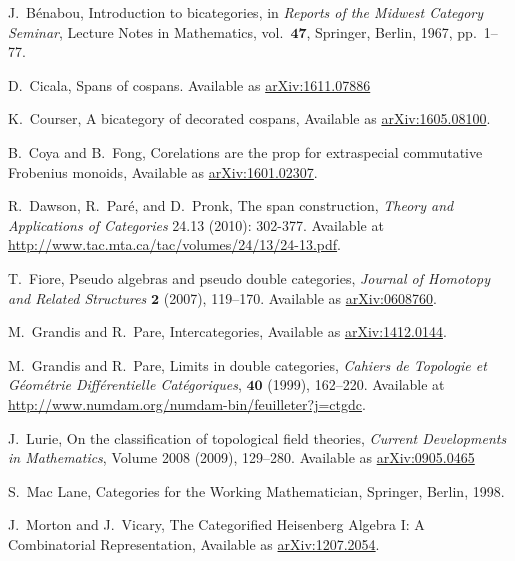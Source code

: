 \documentclass[11pt]{amsart}
\newcommand{\cat}[1]{\mathbf{#1}}
\theoremstyle{remark}
\theoremstyle{definition}
\begin{document}
%
\begin{thebibliography}{100}

J.\ B\'enabou, 
Introduction to bicategories, 
in \emph{Reports of the Midwest Category Seminar}, 
Lecture Notes in Mathematics, 
vol.\ $\cat{47}$, 
Springer, Berlin, 1967, pp.\ 1--77. 

D.\ Cicala, 
Spans of cospans.
Available as \href{https://arxiv.org/abs/1611.07886}{arXiv:1611.07886}


K.\ Courser, 
A bicategory of decorated cospans,
Available as \href{https://arxiv.org/pdf/1605.08100v2.pdf}{arXiv:1605.08100}.

B.\ Coya and B.\ Fong,
Corelations are the prop for extraspecial commutative Frobenius monoids,
Available as \href{https://arxiv.org/abs/1601.02307}{arXiv:1601.02307}.

R.\ Dawson, R.\ Paré, and D.\ Pronk, 
The span construction, 
\emph{Theory and Applications of Categories} 
24.13 (2010): 302-377.
Available at \href{http://www.tac.mta.ca/tac/volumes/24/13/24-13.pdf}{http://www.tac.mta.ca/tac/volumes/24/13/24-13.pdf}.

T.\ Fiore, 
Pseudo algebras and pseudo double categories, 
\emph{Journal of Homotopy and Related Structures} $\mathbf{2}$ 
(2007), 119--170. 
Available as \href{http://arxiv.org/abs/math/0608760}{arXiv:0608760}.

M.\ Grandis and R.\ Pare, 
Intercategories,
Available as \href{https://arxiv.org/abs/1412.0144}{arXiv:1412.0144}.

M.\ Grandis and R.\ Pare, 
Limits in double categories, 
\emph{Cahiers de Topologie et G\'{e}om\'{e}trie Diff\'{e}rentielle Cat\'{e}goriques}, $\mathbf{40}$  
(1999), 162--220. 
Available at \href{http://www.numdam.org/numdam-bin/feuilleter?j=ctgdc}{http://www.numdam.org/numdam-bin/feuilleter?j=ctgdc}.

J.~Lurie,
On the classification of topological field theories,
\emph{Current Developments in Mathematics},
Volume 2008 (2009), 129--280.
Available as \href{https://arxiv.org/abs/0905.0465}{	arXiv:0905.0465}

S.\ Mac Lane, 
Categories for the Working Mathematician,
Springer, Berlin, 1998.

J.\ Morton and J.\ Vicary,
The Categorified Heisenberg Algebra I: A Combinatorial Representation,
Available as \href{https://arxiv.org/abs/1207.2054}{arXiv:1207.2054}.


\end{thebibliography}
\end{document}
